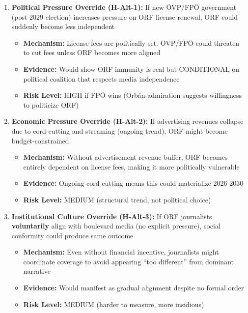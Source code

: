 \begin{enumerate}

\item \textbf{Political Pressure Override (H-Alt-1):} If new ÖVP/FPÖ government (post-2029 election) increases
  pressure on ORF license renewal, ORF could suddenly become less independent
  \begin{itemize}
  \item \textbf{Mechanism:} License fees are politically set. ÖVP/FPÖ could threaten to cut fees unless ORF
    becomes more aligned
  \item \textbf{Evidence:} Would show ORF immunity is real but CONDITIONAL on political coalition that
    respects media independence
  \item \textbf{Risk Level:} HIGH if FPÖ wins (Orbán-admiration suggests willingness to politicize ORF)
  \end{itemize}

\item \textbf{Economic Pressure Override (H-Alt-2):} If advertising revenues collapse due to cord-cutting and
  streaming (ongoing trend), ORF might become budget-constrained
  \begin{itemize}
  \item \textbf{Mechanism:} Without advertisement revenue buffer, ORF becomes entirely dependent on license fees,
    making it more politically vulnerable
  \item \textbf{Evidence:} Ongoing cord-cutting means this could materialize 2026-2030
  \item \textbf{Risk Level:} MEDIUM (structural trend, not political choice)
  \end{itemize}

\item \textbf{Institutional Culture Override (H-Alt-3):} If ORF journalists \textbf{voluntarily} align with
  boulevard media (no explicit pressure), social conformity could produce same outcome
  \begin{itemize}
  \item \textbf{Mechanism:} Even without financial incentive, journalists might coordinate coverage to avoid
    appearing ``too different'' from dominant narrative
  \item \textbf{Evidence:} Would manifest as gradual alignment despite no formal order
  \item \textbf{Risk Level:} MEDIUM (harder to measure, more insidious)
  \end{itemize}

\end{enumerate}

